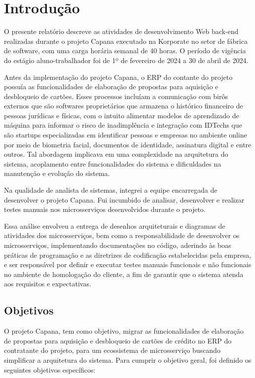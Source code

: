 \chapter{Introdução}
\label{Introdução}
O presente relatório descreve as atividades de desenvolvimento Web back-end 
realizadas durante o projeto Capana executado na Korporate no setor de fábrica de 
software, com uma carga horária semanal de 40 horas. O período de vigência do estágio 
aluno-trabalhador foi de 1º de fevereiro de 2024 a 30 de abril de 2024. 

Antes da implementação do projeto Capana, o ERP do contante do projeto possuía as 
funcionalidades de elaboração de propostas para aquisição e desbloqueio de cartões. 
Esses processos incluíam a comunicação com birôs externos que são softwares proprietários 
que armazena o histórico financeiro de pessoas jurídicas e físicas, com o intuito 
alimentar modelos de aprendizado de máquina para informar o 
risco de inadimplência e integração com IDTechs que são startups especializadas 
em identificar pessoas e empresas no ambiente online por meio de biometria facial, documentos de identidade, 
assinatura digital e entre outros. 
Tal abordagem implicava em uma complexidade na arquitetura do sistema, acoplamento 
entre funcionalidades do sistema e dificuldades na manutenção e evolução do sistema. 				 

Na qualidade de analista de sistemas, integrei a equipe encarregada de desenvolver o 
projeto Capana. Fui incumbido de analisar, desenvolver e realizar testes manuais nos 
microsserviços desenvolvidos durante o projeto. 					 

Essa análise envolveu a entrega de desenhos arquiteturais e diagramas de atividades 
dos microsserviços, bem como a responsabilidade de desenvolver os microsserviços, implementando 
documentações no código, aderindo às boas práticas de programação e as diretrizes de 
codificação estabelecidas pela empresa, e ser responsável por definir e executar 
testes manuais funcionais e não funcionais no ambiente de homologação do cliente, a 
fim de garantir que o sistema atenda aos requisitos e expectativas.  		

\section{Objetivos}

O projeto Capana, tem como objetivo, migrar as funcionalidades de elaboração de 
propostas para aquisição e desbloqueio de cartões de crédito no ERP do contratante do 
projeto, para um ecossistema de microsserviço buscando simplificar a arquitetura do 
sistema. Para cumprir o objetivo geral, foi definido os seguintes objetivos 
específicos: 	

